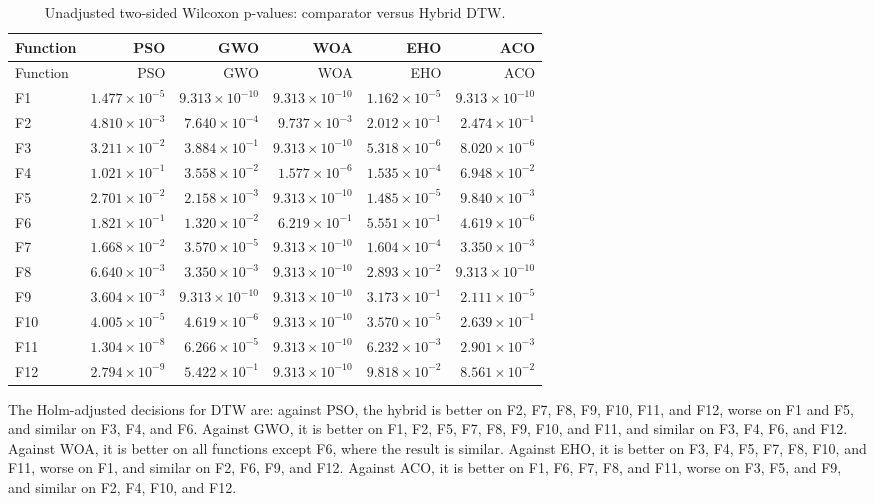 \scriptsize
\begin{longtable}{lrrrrr}
\caption{Unadjusted two-sided Wilcoxon p-values: comparator versus Hybrid DTW.}\label{tab:cec2022-dtw-wilcoxon}\\
\toprule
Function & PSO & GWO & WOA & EHO & ACO\\
\midrule
\endfirsthead
\toprule
Function & PSO & GWO & WOA & EHO & ACO\\
\midrule
\endhead
F1  & $1.477\times10^{-5}$  & $9.313\times10^{-10}$ & $9.313\times10^{-10}$ & $1.162\times10^{-5}$  & $9.313\times10^{-10}$\\
F2  & $4.810\times10^{-3}$  & $7.640\times10^{-4}$  & $9.737\times10^{-3}$  & $2.012\times10^{-1}$  & $2.474\times10^{-1}$\\
F3  & $3.211\times10^{-2}$  & $3.884\times10^{-1}$  & $9.313\times10^{-10}$ & $5.318\times10^{-6}$  & $8.020\times10^{-6}$\\
F4  & $1.021\times10^{-1}$  & $3.558\times10^{-2}$  & $1.577\times10^{-6}$  & $1.535\times10^{-4}$  & $6.948\times10^{-2}$\\
F5  & $2.701\times10^{-2}$  & $2.158\times10^{-3}$  & $9.313\times10^{-10}$ & $1.485\times10^{-5}$  & $9.840\times10^{-3}$\\
F6  & $1.821\times10^{-1}$  & $1.320\times10^{-2}$  & $6.219\times10^{-1}$  & $5.551\times10^{-1}$  & $4.619\times10^{-6}$\\
F7  & $1.668\times10^{-2}$  & $3.570\times10^{-5}$  & $9.313\times10^{-10}$ & $1.604\times10^{-4}$  & $3.350\times10^{-3}$\\
F8  & $6.640\times10^{-3}$  & $3.350\times10^{-3}$  & $9.313\times10^{-10}$ & $2.893\times10^{-2}$  & $9.313\times10^{-10}$\\
F9  & $3.604\times10^{-3}$  & $9.313\times10^{-10}$  & $9.313\times10^{-10}$ & $3.173\times10^{-1}$  & $2.111\times10^{-5}$\\
F10 & $4.005\times10^{-5}$  & $4.619\times10^{-6}$  & $9.313\times10^{-10}$  & $3.570\times10^{-5}$  & $2.639\times10^{-1}$\\
F11 & $1.304\times10^{-8}$  & $6.266\times10^{-5}$  & $9.313\times10^{-10}$  & $6.232\times10^{-3}$  & $2.901\times10^{-3}$\\
F12 & $2.794\times10^{-9}$  & $5.422\times10^{-1}$  & $9.313\times10^{-10}$  & $9.818\times10^{-2}$  & $8.561\times10^{-2}$\\
\bottomrule
\end{longtable}
\normalsize

The Holm-adjusted decisions for DTW are: against PSO, the hybrid is better on
F2, F7, F8, F9, F10, F11, and F12, worse on F1 and F5, and similar on F3,
F4, and F6. Against GWO, it is better on F1, F2, F5, F7, F8, F9, F10, and
F11, and similar on F3, F4, F6, and F12. Against WOA, it is better on all
functions except F6, where the result is similar. Against EHO, it is better
on F3, F4, F5, F7, F8, F10, and F11, worse on F1, and similar on F2, F6, F9,
and F12. Against ACO, it is better on F1, F6, F7, F8, and F11, worse on F3,
F5, and F9, and similar on F2, F4, F10, and F12.

